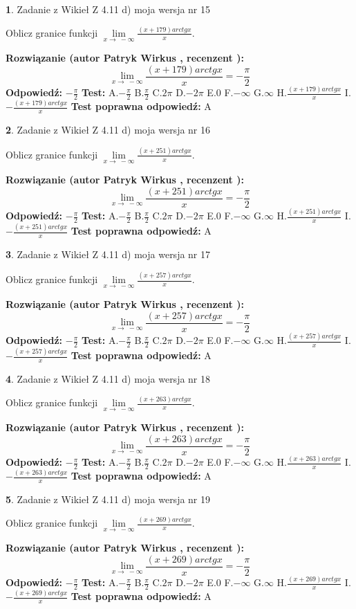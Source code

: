 \documentclass[12pt, a4paper]{article}
\theoremstyle{definition} %
\newtheorem{zad}{}
\newcommand{\zadStart}[1]{\begin{zad}#1\newline}
\newcommand{\zadStop}{\end{zad}}
\newcommand{\rozwStart}[2]{\noindent \textbf{Rozwiązanie (autor #1 , recenzent #2): }\newline}
\newcommand{\rozwStop}{\newline}
\newcommand{\odpStart}{\noindent \textbf{Odpowiedź:}\newline}
\newcommand{\odpStop}{\newline}
\newcommand{\testStart}{\noindent \textbf{Test:}\newline}
\newcommand{\testStop}{\newline}
\newcommand{\kluczStart}{\noindent \textbf{Test poprawna odpowiedź:}\newline}
\newcommand{\kluczStop}{\newline}
\begin{document}
\zadStart{Zadanie z Wikieł Z 4.11 d) moja wersja nr 15}

Oblicz granice funkcji $\lim\limits_{x\to\ -\infty}\frac{(x+179)arctgx}{x}$.
\zadStop
\rozwStart{Patryk Wirkus}{}
$$\lim\limits_{x\to\ -\infty}\frac{(x+179)arctgx}{x} = -\frac{\pi}{2}$$
\rozwStop
\odpStart
$-\frac{\pi}{2}$
\odpStop
\testStart
A.$-\frac{\pi}{2}$ B.$\frac{\pi}{2}$ C.$2\pi$ D.$-2\pi$ E.$0$ F.$-\infty$ G.$\infty$ H.$\frac{(x+179)arctgx}{x}$ I.$-\frac{(x+179)arctgx}{x}$
\testStop
\kluczStart
A
\kluczStop



\zadStart{Zadanie z Wikieł Z 4.11 d) moja wersja nr 16}

Oblicz granice funkcji $\lim\limits_{x\to\ -\infty}\frac{(x+251)arctgx}{x}$.
\zadStop
\rozwStart{Patryk Wirkus}{}
$$\lim\limits_{x\to\ -\infty}\frac{(x+251)arctgx}{x} = -\frac{\pi}{2}$$
\rozwStop
\odpStart
$-\frac{\pi}{2}$
\odpStop
\testStart
A.$-\frac{\pi}{2}$ B.$\frac{\pi}{2}$ C.$2\pi$ D.$-2\pi$ E.$0$ F.$-\infty$ G.$\infty$ H.$\frac{(x+251)arctgx}{x}$ I.$-\frac{(x+251)arctgx}{x}$
\testStop
\kluczStart
A
\kluczStop



\zadStart{Zadanie z Wikieł Z 4.11 d) moja wersja nr 17}

Oblicz granice funkcji $\lim\limits_{x\to\ -\infty}\frac{(x+257)arctgx}{x}$.
\zadStop
\rozwStart{Patryk Wirkus}{}
$$\lim\limits_{x\to\ -\infty}\frac{(x+257)arctgx}{x} = -\frac{\pi}{2}$$
\rozwStop
\odpStart
$-\frac{\pi}{2}$
\odpStop
\testStart
A.$-\frac{\pi}{2}$ B.$\frac{\pi}{2}$ C.$2\pi$ D.$-2\pi$ E.$0$ F.$-\infty$ G.$\infty$ H.$\frac{(x+257)arctgx}{x}$ I.$-\frac{(x+257)arctgx}{x}$
\testStop
\kluczStart
A
\kluczStop



\zadStart{Zadanie z Wikieł Z 4.11 d) moja wersja nr 18}

Oblicz granice funkcji $\lim\limits_{x\to\ -\infty}\frac{(x+263)arctgx}{x}$.
\zadStop
\rozwStart{Patryk Wirkus}{}
$$\lim\limits_{x\to\ -\infty}\frac{(x+263)arctgx}{x} = -\frac{\pi}{2}$$
\rozwStop
\odpStart
$-\frac{\pi}{2}$
\odpStop
\testStart
A.$-\frac{\pi}{2}$ B.$\frac{\pi}{2}$ C.$2\pi$ D.$-2\pi$ E.$0$ F.$-\infty$ G.$\infty$ H.$\frac{(x+263)arctgx}{x}$ I.$-\frac{(x+263)arctgx}{x}$
\testStop
\kluczStart
A
\kluczStop



\zadStart{Zadanie z Wikieł Z 4.11 d) moja wersja nr 19}

Oblicz granice funkcji $\lim\limits_{x\to\ -\infty}\frac{(x+269)arctgx}{x}$.
\zadStop
\rozwStart{Patryk Wirkus}{}
$$\lim\limits_{x\to\ -\infty}\frac{(x+269)arctgx}{x} = -\frac{\pi}{2}$$
\rozwStop
\odpStart
$-\frac{\pi}{2}$
\odpStop
\testStart
A.$-\frac{\pi}{2}$ B.$\frac{\pi}{2}$ C.$2\pi$ D.$-2\pi$ E.$0$ F.$-\infty$ G.$\infty$ H.$\frac{(x+269)arctgx}{x}$ I.$-\frac{(x+269)arctgx}{x}$
\testStop
\kluczStart
A
\kluczStop
\end{document}
